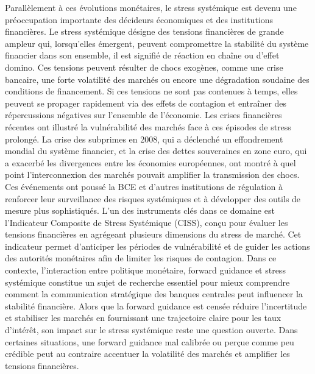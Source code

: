 Parallèlement à ces évolutions monétaires, le stress systémique est devenu une préoccupation importante des décideurs économiques et des institutions financières. Le stress systémique désigne des tensions financières de grande ampleur qui, lorsqu’elles émergent, peuvent compromettre la stabilité du système financier dans son ensemble, il est signifié de réaction en chaîne ou d'effet domino. Ces tensions peuvent résulter de chocs exogènes, comme une crise bancaire, une forte volatilité des marchés ou encore une dégradation soudaine des conditions de financement. Si ces tensions ne sont pas contenues à temps, elles peuvent se propager rapidement via des effets de contagion et entraîner des répercussions négatives sur l’ensemble de l’économie. Les crises financières récentes ont illustré la vulnérabilité des marchés face à ces épisodes de stress prolongé. La crise des subprimes en 2008, qui a déclenché un effondrement mondial du système financier, et la crise des dettes souveraines en zone euro, qui a exacerbé les divergences entre les économies européennes, ont montré à quel point l’interconnexion des marchés pouvait amplifier la transmission des chocs. Ces événements ont poussé la BCE et d’autres institutions de régulation à renforcer leur surveillance des risques systémiques et à développer des outils de mesure plus sophistiqués. L’un des instruments clés dans ce domaine est l’Indicateur Composite de Stress Systémique (CISS), conçu pour évaluer les tensions financières en agrégeant plusieurs dimensions du stress de marché. Cet indicateur permet d’anticiper les périodes de vulnérabilité et de guider les actions des autorités monétaires afin de limiter les risques de contagion. Dans ce contexte, l’interaction entre politique monétaire, forward guidance et stress systémique constitue un sujet de recherche essentiel pour mieux comprendre comment la communication stratégique des banques centrales peut influencer la stabilité financière. Alors que la forward guidance est censée réduire l’incertitude et stabiliser les marchés en fournissant une trajectoire claire pour les taux d’intérêt, son impact sur le stress systémique reste une question ouverte. Dans certaines situations, une forward guidance mal calibrée ou perçue comme peu crédible peut au contraire accentuer la volatilité des marchés et amplifier les tensions financières.\\

